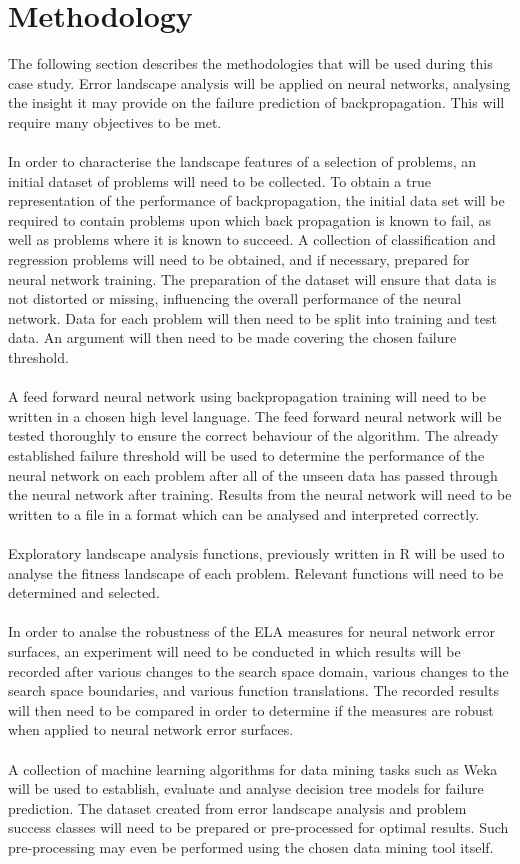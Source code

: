 \documentclass[runningheads,a4paper]{llncs}
\begin{document}
\section{Methodology}

The following section describes the methodologies that will be used during this case study. Error landscape analysis will be applied on neural networks, analysing the 
insight it may provide on the failure prediction of backpropagation. This will require many objectives to be met. 
\\\\
In order to characterise the landscape features of a selection of problems, an initial dataset of problems will need to be collected. To obtain a true representation 
of the performance of backpropagation, the initial data set will be required to contain problems upon which back propagation is known to fail, as well as problems where it 
is known to succeed. A collection of classification and regression problems will need to be obtained, and if necessary, prepared for neural network training. The preparation 
of the dataset will ensure that data is not distorted or missing, influencing the overall performance of the neural network. Data for each problem will then need
to be split into training and test data. An argument will then need to be made covering the chosen failure threshold.
\\\\
A feed forward neural network using backpropagation training will need to be written in a chosen high level language. The feed forward neural network will be tested thoroughly 
to ensure the correct behaviour of the algorithm. The already established failure threshold will be used to determine the performance of the neural network on each problem after
all of the unseen data has passed through the neural network after training. Results from the neural network will need to be written to a file in a format which can be 
analysed and interpreted correctly.
\\\\
Exploratory landscape analysis functions, previously written in R will be used to analyse the fitness landscape of each problem. Relevant functions will need to be determined
and selected. 
\\\\
In order to analse the robustness of the ELA measures for neural network error surfaces, an experiment will need to be conducted in which results will be recorded after various changes
to the search space domain, various changes to the search space boundaries, and various function translations. The recorded results will then need to be compared in order to determine 
if the measures are robust when applied to neural network error surfaces.
\\\\
A collection of machine learning algorithms for data mining tasks such as Weka will be used to establish, evaluate and analyse decision tree models for failure prediction. The dataset 
created from error landscape analysis and problem success classes will need to be prepared or pre-processed for optimal results. Such pre-processing may even be performed using the 
chosen data mining tool itself. 
\end{document}
